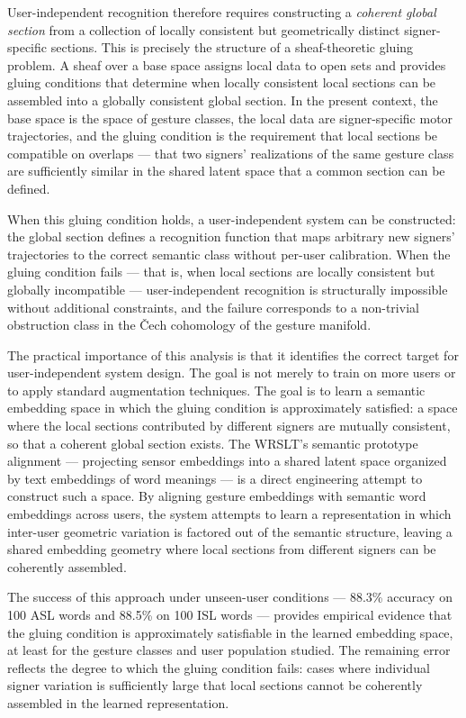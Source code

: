 \documentclass[11pt, a4paper]{article}
\theoremstyle{definition}
\begin{document}
User-independent recognition therefore requires constructing a \emph{coherent global section} from a collection of locally consistent but geometrically distinct signer-specific sections. This is precisely the structure of a sheaf-theoretic gluing problem. A sheaf over a base space assigns local data to open sets and provides gluing conditions that determine when locally consistent local sections can be assembled into a globally consistent global section. In the present context, the base space is the space of gesture classes, the local data are signer-specific motor trajectories, and the gluing condition is the requirement that local sections be compatible on overlaps --- that two signers' realizations of the same gesture class are sufficiently similar in the shared latent space that a common section can be defined.

When this gluing condition holds, a user-independent system can be constructed: the global section defines a recognition function that maps arbitrary new signers' trajectories to the correct semantic class without per-user calibration. When the gluing condition fails --- that is, when local sections are locally consistent but globally incompatible --- user-independent recognition is structurally impossible without additional constraints, and the failure corresponds to a non-trivial obstruction class in the \v{C}ech cohomology of the gesture manifold.

The practical importance of this analysis is that it identifies the correct target for user-independent system design. The goal is not merely to train on more users or to apply standard augmentation techniques. The goal is to learn a semantic embedding space in which the gluing condition is approximately satisfied: a space where the local sections contributed by different signers are mutually consistent, so that a coherent global section exists. The WRSLT's semantic prototype alignment --- projecting sensor embeddings into a shared latent space organized by text embeddings of word meanings --- is a direct engineering attempt to construct such a space. By aligning gesture embeddings with semantic word embeddings across users, the system attempts to learn a representation in which inter-user geometric variation is factored out of the semantic structure, leaving a shared embedding geometry where local sections from different signers can be coherently assembled.

The success of this approach under unseen-user conditions --- 88.3\% accuracy on 100 ASL words and 88.5\% on 100 ISL words --- provides empirical evidence that the gluing condition is approximately satisfiable in the learned embedding space, at least for the gesture classes and user population studied. The remaining error reflects the degree to which the gluing condition fails: cases where individual signer variation is sufficiently large that local sections cannot be coherently assembled in the learned representation.
\end{document}
